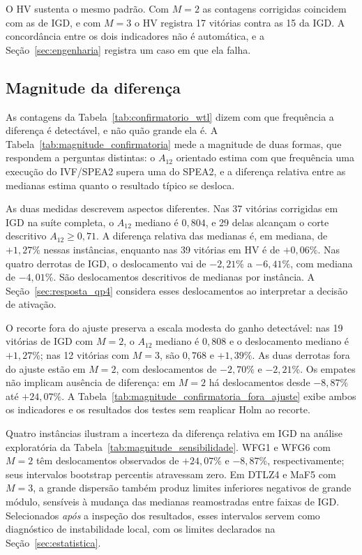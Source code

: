 O HV sustenta o mesmo padrão. Com $M = 2$ as contagens corrigidas coincidem com as de IGD, e com $M = 3$ o HV registra 17 vitórias contra as 15 da IGD. A concordância entre os dois indicadores não é automática, e a Seção~\ref{sec:engenharia} registra um caso em que ela falha.

\subsection{Magnitude da diferença}
\label{sec:magnitude}

As contagens da Tabela~\ref{tab:confirmatorio_wtl} dizem com que frequência a diferença é detectável, e não quão grande ela é. A Tabela~\ref{tab:magnitude_confirmatoria} mede a magnitude de duas formas, que respondem a perguntas distintas: o $A_{12}$ orientado estima com que frequência uma execução do IVF/SPEA2 supera uma do SPEA2, e a diferença relativa entre as medianas estima quanto o resultado típico se desloca.



As duas medidas descrevem aspectos diferentes. Nas 37 vitórias corrigidas em IGD na suíte completa, o $A_{12}$ mediano é $0{,}804$, e 29 delas alcançam o corte descritivo $A_{12}\geq 0{,}71$. A diferença relativa das medianas é, em mediana, de $+1{,}27\%$ nessas instâncias, enquanto nas 39 vitórias em HV é de $+0{,}06\%$. Nas quatro derrotas de IGD, o deslocamento vai de $-2{,}21\%$ a $-6{,}41\%$, com mediana de $-4{,}01\%$. São deslocamentos descritivos de medianas por instância.
A Seção~\ref{sec:resposta_qp4} considera esses deslocamentos ao interpretar a decisão de ativação.

O recorte fora do ajuste preserva a escala modesta do ganho detectável: nas 19 vitórias de IGD com $M=2$, o $A_{12}$ mediano é $0{,}808$ e o deslocamento mediano é $+1{,}27\%$; nas 12 vitórias com $M=3$, são $0{,}768$ e $+1{,}39\%$. As duas derrotas fora do ajuste estão em $M=2$, com deslocamentos de $-2{,}70\%$ e $-2{,}21\%$. Os empates não implicam ausência de diferença: em $M=2$ há deslocamentos desde $-8{,}87\%$ até $+24{,}07\%$. A Tabela~\ref{tab:magnitude_confirmatoria_fora_ajuste} exibe ambos os indicadores e os resultados dos testes sem reaplicar Holm ao recorte.



Quatro instâncias ilustram a incerteza da diferença relativa em IGD na análise exploratória da Tabela~\ref{tab:magnitude_sensibilidade}. WFG1 e WFG6 com $M=2$ têm deslocamentos observados de $+24{,}07\%$ e $-8{,}87\%$, respectivamente; seus intervalos bootstrap percentis atravessam zero. Em DTLZ4 e MaF5 com $M=3$, a grande dispersão também produz limites inferiores negativos de grande módulo, sensíveis à mudança das medianas reamostradas entre faixas de IGD. Selecionados \emph{após} a inspeção dos resultados, esses intervalos servem como diagnóstico de instabilidade local, com os limites declarados na Seção~\ref{sec:estatistica}.

